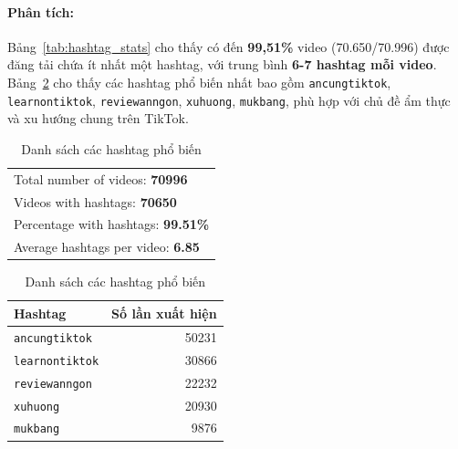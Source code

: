 \paragraph{Phân tích:}
Bảng~\ref{tab:hashtag_stats} cho thấy có đến \textbf{99,51\%} video (70.650/70.996) được đăng tải chứa ít nhất một hashtag, với trung bình \textbf{6-7 hashtag mỗi video}. Bảng~\ref{tab:popular_hashtags} cho thấy các hashtag phổ biến nhất bao gồm \texttt{ancungtiktok}, \texttt{learnontiktok}, \texttt{reviewanngon}, \texttt{xuhuong}, \texttt{mukbang}, phù hợp với chủ đề ẩm thực và xu hướng chung trên TikTok.

\begin{table}[H]
\centering
\begin{minipage}[t]{0.47\textwidth}
    \centering
    \caption{Kết quả thống kê về hashtag}
    \label{tab:hashtag_stats}
    \renewcommand{\arraystretch}{1.3}
    \setlength{\tabcolsep}{4pt}
    \begin{tabular}{l}
    \toprule
    Total number of videos: \textbf{70996} \\
    Videos with hashtags: \textbf{70650} \\
    Percentage with hashtags: \textbf{99.51\%} \\
    Average hashtags per video: \textbf{6.85} \\
    \bottomrule
    \end{tabular}
\end{minipage}%
\hspace{0.01\textwidth}\vrule\hspace{0.01\textwidth}%
\begin{minipage}[t]{0.47\textwidth}
    \centering
    \caption{Danh sách các hashtag phổ biến}
    \label{tab:popular_hashtags}
    \renewcommand{\arraystretch}{1.3}
    \setlength{\tabcolsep}{6pt}
    \begin{tabular}{lr}
    \toprule
    \textbf{Hashtag} & \textbf{Số lần xuất hiện} \\
    \midrule
    \texttt{ancungtiktok} & 50231 \\
    \texttt{learnontiktok} & 30866 \\
    \texttt{reviewanngon} & 22232 \\
    \texttt{xuhuong} & 20930 \\
    \texttt{mukbang} & 9876 \\
    \bottomrule
    \end{tabular}
\end{minipage}
\end{table}

